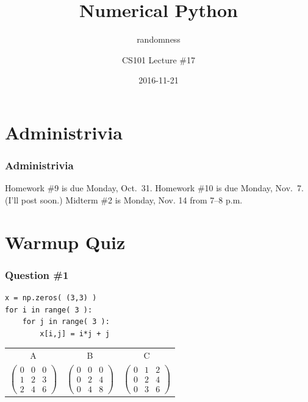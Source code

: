 \documentclass[11pt]{beamer}
\title{Numerical Python}
\subtitle{randomness}
\author{CS101 Lecture \#17}
\date{2016-11-21}
\begin{document}
  \setcounter{showProgressBar}{0}
  \setcounter{showSlideNumbers}{0}

\frame{\titlepage}

\setcounter{framenumber}{0}
\setcounter{showProgressBar}{1}
\setcounter{showSlideNumbers}{1}

\section{Administrivia}

\begin{frame}
  \frametitle{Administrivia}
  \Enlarge

  \begin{itemize}
  \myitem  Homework \#9 is due Monday, Oct.\ 31.
  \myitem  Homework \#10 is due Monday, Nov.\ 7.  \textcolor{CS101Alt}{(I'll post soon.)}
  \myitem  Midterm \#2 is Monday, Nov. 14 from 7–8 p.m.
  \end{itemize}
\end{frame}


\section{Warmup Quiz}

\begin{frame}[fragile]
  \frametitle{Question \#1}
  \Enlarge

  \begin{Verbatim}
x = np.zeros( (3,3) )
for i in range( 3 ):
    for j in range( 3 ):
        x[i,j] = i*j + j
  \end{Verbatim}

  \begin{center}
  \begin{tabular}{ccc}
    A & B & C \\
    $\left(
    \begin{array}{ccc}
    0 & 0 & 0 \\
    1 & 2 & 3 \\
    2 & 4 & 6
    \end{array}
    \right)$
    &
    $\left(
    \begin{array}{ccc}
    0 & 0 & 0 \\
    0 & 2 & 4 \\
    0 & 4 & 8
    \end{array}
    \right)$
    &
    $\left(
    \begin{array}{ccc}
    0 & 1 & 2 \\
    0 & 2 & 4 \\
    0 & 3 & 6
    \end{array}
    \right)$
  \end{tabular}
  \end{center}
\end{frame}
\end{document}

